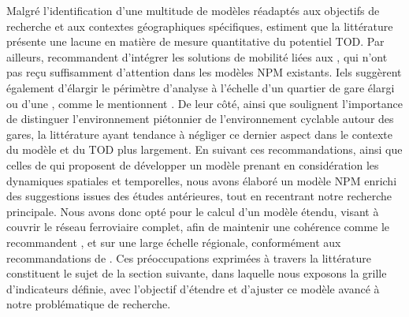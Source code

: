 \begin{refsegment}
Malgré l'identification d'une multitude de modèles réadaptés aux objectifs de recherche et aux contextes géographiques spécifiques, \textcolor{blue}{\textcite[394]{ibrahim_planning_2022}} estiment que la littérature présente une lacune en matière de mesure quantitative du potentiel \acrshort{TOD}. Par ailleurs, \textcolor{blue}{\textcite[10-12]{olaru_place_2019}} recommandent d'intégrer les solutions de mobilité liées aux , qui n'ont pas reçu suffisamment d'attention dans les modèles \acrshort{NPM} existants. Iels suggèrent également d'élargir le périmètre d'analyse à l'échelle d'un quartier de gare élargi ou d'une , comme le mentionnent \textcolor{blue}{\textcite[280]{li_transit_2019}}. De leur côté, \textcolor{blue}{\textcite[80]{robillard_transit-oriented_2024}} ainsi que \textcolor{blue}{\textcite[120]{nigro_land_2019}} soulignent l'importance de distinguer l'environnement piétonnier de l'environnement cyclable autour des gares, la littérature ayant tendance à négliger ce dernier aspect dans le contexte du modèle et du \acrshort{TOD} plus largement. En suivant ces recommandations, ainsi que celles de \textcolor{blue}{\textcite[9]{motieyan_development_2018}} qui proposent de développer un modèle prenant en considération les dynamiques spatiales et temporelles, nous avons élaboré un modèle \acrshort{NPM} enrichi des suggestions issues des études antérieures, tout en recentrant notre recherche principale. Nous avons donc opté pour le calcul d'un modèle étendu, visant à couvrir le réseau ferroviaire complet, afin de maintenir une cohérence comme le recommandent \textcolor{blue}{\autocite[58]{chorus_application_2011}}, et sur une large échelle régionale, conformément aux recommandations de \textcolor{blue}{\textcite[643]{wei_classifying_2023}}. Ces préoccupations exprimées à travers la littérature constituent le sujet de la section suivante, dans laquelle nous exposons la grille d'indicateurs définie, avec l'objectif d'étendre et d'ajuster ce modèle avancé à notre problématique de recherche.%


\end{refsegment}
